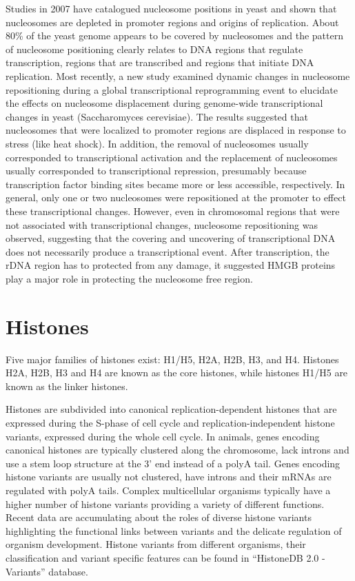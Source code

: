 Studies in 2007 have catalogued nucleosome positions in yeast and shown that nucleosomes are depleted in promoter regions and origins of replication. About 80\% of the yeast genome appears to be covered by nucleosomes and the pattern of nucleosome positioning clearly relates to DNA regions that regulate transcription, regions that are transcribed and regions that initiate DNA replication. Most recently, a new study examined dynamic changes in nucleosome repositioning during a global transcriptional reprogramming event to elucidate the effects on nucleosome displacement during genome-wide transcriptional changes in yeast (Saccharomyces cerevisiae). The results suggested that nucleosomes that were localized to promoter regions are displaced in response to stress (like heat shock). In addition, the removal of nucleosomes usually corresponded to transcriptional activation and the replacement of nucleosomes usually corresponded to transcriptional repression, presumably because transcription factor binding sites became more or less accessible, respectively. In general, only one or two nucleosomes were repositioned at the promoter to effect these transcriptional changes. However, even in chromosomal regions that were not associated with transcriptional changes, nucleosome repositioning was observed, suggesting that the covering and uncovering of transcriptional DNA does not necessarily produce a transcriptional event. After transcription, the rDNA region has to protected from any damage, it suggested HMGB proteins play a major role in protecting the nucleosome free region.

\hypertarget{histones}{%
\section{Histones}\label{histones}}

Five major families of histones exist: H1/H5, H2A, H2B, H3, and H4. Histones H2A, H2B, H3 and H4 are known as the core histones, while histones H1/H5 are known as the linker histones.

Histones are subdivided into canonical replication-dependent histones that are expressed during the S-phase of cell cycle and replication-independent histone variants, expressed during the whole cell cycle. In animals, genes encoding canonical histones are typically clustered along the chromosome, lack introns and use a stem loop structure at the 3' end instead of a polyA tail. Genes encoding histone variants are usually not clustered, have introns and their mRNAs are regulated with polyA tails. Complex multicellular organisms typically have a higher number of histone variants providing a variety of different functions. Recent data are accumulating about the roles of diverse histone variants highlighting the functional links between variants and the delicate regulation of organism development. Histone variants from different organisms, their classification and variant specific features can be found in ``HistoneDB 2.0 - Variants'' database.


